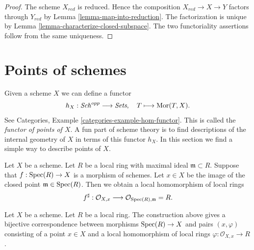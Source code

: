 \begin{proof}
The scheme $X_{red}$ is reduced. Hence the composition
$X_{red} \to X \to Y$ factors through $Y_{red}$ by
Lemma \ref{lemma-map-into-reduction}. The factorization is unique by
Lemma \ref{lemma-characterize-closed-subspace}. The two functoriality
assertions follow from the same uniqueness.
\end{proof}










\section{Points of schemes}
\label{section-points}

\noindent
Given a scheme $X$ we can define a functor
$$
h_X : \mathit{Sch}^{opp}
\longrightarrow
\textit{Sets}, \quad
T \longmapsto \mathop{\mathrm{Mor}}\nolimits(T, X).
$$
See Categories, Example \ref{categories-example-hom-functor}.
This is called the {\it functor of points of $X$}.
A fun part of scheme theory is to find descriptions of
the internal geometry of $X$ in terms of this functor $h_X$.
In this section we find a simple way to describe
points of $X$.

\medskip\noindent
Let $X$ be a scheme. Let $R$ be a local ring with maximal ideal
$\mathfrak m \subset R$. Suppose that $f : \mathop{\mathrm{Spec}}(R) \to X$
is a morphism of schemes. Let $x \in X$ be the image of the closed point
$\mathfrak m \in \mathop{\mathrm{Spec}}(R)$. Then we obtain a local homomorphism
of local rings
$$
f^\sharp :
\mathcal{O}_{X, x}
\longrightarrow
\mathcal{O}_{\mathop{\mathrm{Spec}}(R), \mathfrak m} = R.
$$

\begin{lemma}
\label{lemma-morphism-from-spec-local-ring}
Let $X$ be a scheme. Let $R$ be a local ring.
The construction above gives a bijective correspondence
between morphisms $\mathop{\mathrm{Spec}}(R) \to X$ and pairs
$(x, \varphi)$ consisting of a point $x \in X$ and
a local homomorphism of local rings $\varphi : \mathcal{O}_{X, x} \to R$.
\end{lemma}

